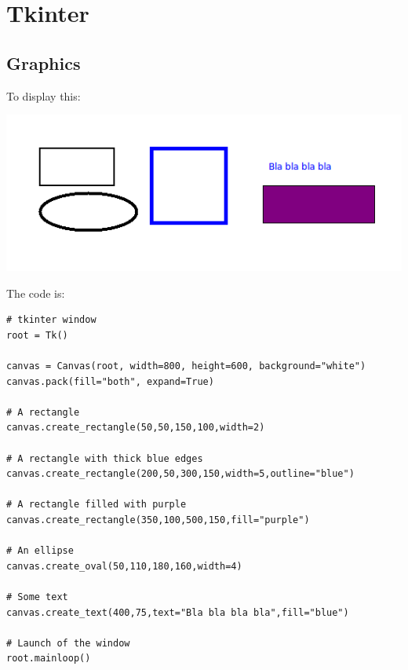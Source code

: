 \documentclass[11pt,class=report,crop=false]{standalone}
\begin{document}
\section{Tkinter}

\subsection{Graphics}

To display this:
\begin{center}
\includegraphics[scale=\myscale,scale=0.6]{../statistics/screen-stat-lesson-intro}
\end{center}
The code is:
\begin{lstlisting}
# tkinter window
root = Tk()
        
canvas = Canvas(root, width=800, height=600, background="white")
canvas.pack(fill="both", expand=True)

# A rectangle
canvas.create_rectangle(50,50,150,100,width=2)

# A rectangle with thick blue edges
canvas.create_rectangle(200,50,300,150,width=5,outline="blue")

# A rectangle filled with purple
canvas.create_rectangle(350,100,500,150,fill="purple")

# An ellipse
canvas.create_oval(50,110,180,160,width=4)

# Some text
canvas.create_text(400,75,text="Bla bla bla bla",fill="blue")

# Launch of the window
root.mainloop()
\end{lstlisting}
\end{document}

